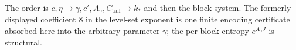 The order is $c,\eta\to\gamma,c',A_\gamma,C_{\mathrm{tail}}\to k_*$ and then
the block system.  The formerly displayed coefficient $8$ in the level-set
exponent is one finite encoding certificate absorbed here into the arbitrary
parameter $\gamma$; the per-block entropy $e^{A_\gamma J}$ is structural.
